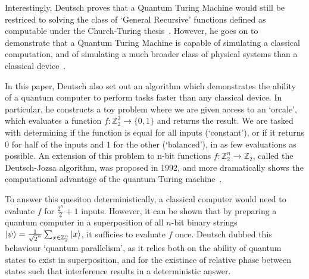 \documentclass{standalone}
\begin{document}
\par
Interestingly, Deutsch proves that a Quantum Turing Machine would still be restriced to solving the class of `General Recursive' functions defined as computable under the Church-Turing thesis~\cite{Deutsch1985}. However, he goes on to demonstrate that a Quantum Turing Machine is capable of simulating a classical computation, and of simulating a much broader class of physical systems than a classical device~\cite{Deutsch1985}.
\par
In this paper, Deutsch also set out an algorithm which demonstrates the ability of a quantum computer to perform tasks faster than any classical device. In particular, he constructs a toy problem where we are given access to an `orcale', which evaluates a function $f:\mathbb{Z}_{2}^{2}\rightarrow\{0,1\}$ and returns the result. We are tasked with determining if the function is equal for all inputs (`constant'), or if it returns $0$ for half of the inputs and $1$ for the other (`balanced'), in as few evaluations as possible. An extension of this problem to n-bit functions $f:\mathbb{Z}_{2}^{n}\rightarrow\mathbb{Z}_{2}$, called the Deutsch-Jozsa algorithm, was proposed in 1992, and more dramatically shows the computational advantage of the quantum Turing machine~\cite{Deutsch92}.
\par
To answer this quesiton deterministically, a classical computer would need to evaluate $f$ for $\frac{2^{n}}{2}+1$ inputs. However, it can be shown that by preparing a quantum computer in a superposition of all $n$-bit binary strings $\ket{\psi}=\frac{1}{\sqrt{2}^{n}}\sum_{x\in\mathbb{Z}_{2}^{n}}\ket{x}$, it sufficies to evaluate $f$ once. Deutsch dubbed this behaviour `quantum parallelism', as it relies both on the ability of quantum states to exist in superposition, and for the existince of relative phase between states such that interference results in a deterministic answer.
\par
\end{document}
